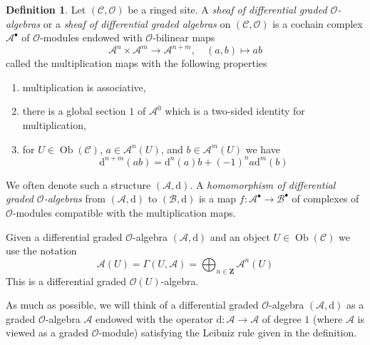 \documentclass{stacks-project}
\theoremstyle{plain}
\theoremstyle{definition}
\newtheorem{definition}[subsection]{Definition}
\theoremstyle{remark}
\numberwithin{equation}{subsection}
\def\Ob{\mathop{\mathrm{Ob}}\nolimits}
\begin{document}
\begin{definition}
\label{definition-dga}
Let $(\mathcal{C}, \mathcal{O})$ be a ringed site. A
{\it sheaf of differential graded $\mathcal{O}$-algebras}
or a {\it sheaf of differential graded algebras} on
$(\mathcal{C}, \mathcal{O})$ is a cochain complex
$\mathcal{A}^\bullet$ of $\mathcal{O}$-modules
endowed with $\mathcal{O}$-bilinear maps
$$
\mathcal{A}^n \times \mathcal{A}^m \to \mathcal{A}^{n + m},\quad
(a, b) \longmapsto ab
$$
called the multiplication maps with the following properties
\begin{enumerate}
\item multiplication is associative,
\item there is a global section $1$ of $\mathcal{A}^0$
which is a two-sided identity for multiplication,
\item for $U \in \Ob(\mathcal{C})$, $a \in \mathcal{A}^n(U)$, and
$b \in \mathcal{A}^m(U)$ we have
$$
\text{d}^{n + m}(ab) = \text{d}^n(a)b + (-1)^n a\text{d}^m(b)
$$
\end{enumerate}
We often denote such a structure $(\mathcal{A}, \text{d})$.
A {\it homomorphism of differential graded $\mathcal{O}$-algebras}
from $(\mathcal{A}, \text{d})$ to $(\mathcal{B}, \text{d})$ is a map
$f : \mathcal{A}^\bullet \to \mathcal{B}^\bullet$ of complexes
of $\mathcal{O}$-modules compatible with the multiplication maps.
\end{definition}

\noindent
Given a differential graded $\mathcal{O}$-algebra $(\mathcal{A}, \text{d})$
and an object $U \in \Ob(\mathcal{C})$ we use the notation
$$
\mathcal{A}(U) =
\Gamma(U, \mathcal{A}) =
\bigoplus\nolimits_{n \in \mathbf{Z}} \mathcal{A}^n(U)
$$
This is a differential graded $\mathcal{O}(U)$-algebra.

\medskip\noindent
As much as possible, we will think of a differential graded
$\mathcal{O}$-algebra $(\mathcal{A}, \text{d})$
as a graded $\mathcal{O}$-algebra $\mathcal{A}$ endowed with
the operator $\text{d} : \mathcal{A} \to \mathcal{A}$ of degree $1$
(where $\mathcal{A}$ is viewed as a graded $\mathcal{O}$-module)
satisfying the Leibniz rule given in the definition.
\end{document}
